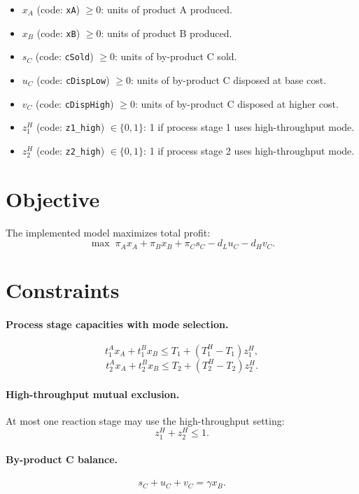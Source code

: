\begin{itemize}
    \item $x_A$ (code: \texttt{xA}) $\ge 0$: units of product A produced.
    \item $x_B$ (code: \texttt{xB}) $\ge 0$: units of product B produced.
    \item $s_C$ (code: \texttt{cSold}) $\ge 0$: units of by-product C sold.
    \item $u_C$ (code: \texttt{cDispLow}) $\ge 0$: units of by-product C disposed at base cost.
    \item $v_C$ (code: \texttt{cDispHigh}) $\ge 0$: units of by-product C disposed at higher cost.
    \item $z^{H}_{1}$ (code: \texttt{z1\_high}) $\in \{0,1\}$: 1 if process stage 1 uses high-throughput mode.
    \item $z^{H}_{2}$ (code: \texttt{z2\_high}) $\in \{0,1\}$: 1 if process stage 2 uses high-throughput mode.
\end{itemize}

\section*{Objective}

The implemented model maximizes total profit:
\[
\max \;
\pi_A x_A + \pi_B x_B + \pi_C s_C - d_L u_C - d_H v_C .
\]

\section*{Constraints}

\paragraph{Process stage capacities with mode selection.}
\[
t^{A}_{1} x_A + t^{B}_{1} x_B \le T_{1} + (T^{H}_{1} - T_{1}) z^{H}_{1},
\]
\[
t^{A}_{2} x_A + t^{B}_{2} x_B \le T_{2} + (T^{H}_{2} - T_{2}) z^{H}_{2}.
\]

\paragraph{High-throughput mutual exclusion.}
At most one reaction stage may use the high-throughput setting:
\[
z^{H}_{1} + z^{H}_{2} \le 1.
\]

\paragraph{By-product C balance.}
\[
s_C + u_C + v_C = \gamma x_B.
\]

